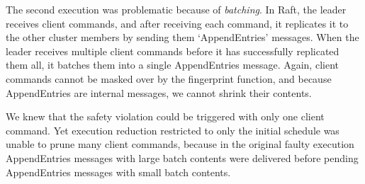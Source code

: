 %
%


The second execution was problematic because of {\em batching}. In
Raft, the leader receives client commands, and after receiving each
command, it replicates it to the other
cluster members by sending them `AppendEntries' messages. When the leader receives multiple client commands
before it has successfully replicated them all, it batches them
into a single AppendEntries message. %
Again, client commands cannot be masked over by the fingerprint function, and
because AppendEntries are internal messages, we cannot shrink their
contents.

We knew that the safety violation
could be triggered with only one client command.
Yet execution reduction restricted to only the initial schedule was unable to prune many client
commands, because in the original faulty execution AppendEntries
messages with large batch contents were delivered before pending
AppendEntries messages with small batch contents.

